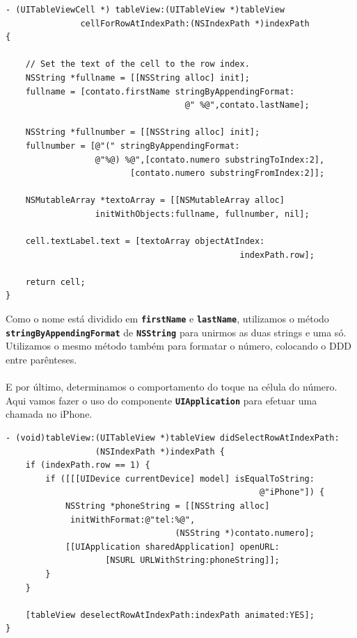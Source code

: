 \documentclass[a4paper,12pt,brazil,doubleside]{book}
\begin{document}
\begin{listing}
\begin{verbatim}
- (UITableViewCell *) tableView:(UITableView *)tableView
               cellForRowAtIndexPath:(NSIndexPath *)indexPath
{
    
    // Set the text of the cell to the row index.
    NSString *fullname = [[NSString alloc] init];
    fullname = [contato.firstName stringByAppendingFormat:
                                    @" %@",contato.lastName];
    
    NSString *fullnumber = [[NSString alloc] init];
    fullnumber = [@"(" stringByAppendingFormat:
                  @"%@) %@",[contato.numero substringToIndex:2],
                         [contato.numero substringFromIndex:2]];
    
    NSMutableArray *textoArray = [[NSMutableArray alloc]
                  initWithObjects:fullname, fullnumber, nil];

    cell.textLabel.text = [textoArray objectAtIndex:
                                               indexPath.row];
    
    return cell;
}
\end{verbatim}
\end{listing}

\pagebreak

Como o nome está dividido em \texttt{\textbf{firstName}} e \texttt{\textbf{lastName}}, utilizamos o método\\
\texttt{\textbf{stringByAppendingFormat}} de \texttt{\textbf{NSString}} para unirmos as duas strings e uma só. Utilizamos o mesmo método também para formatar o número, colocando o DDD entre parênteses.
\paragraph{}E por último, determinamos o comportamento do toque na célula do número. Aqui vamos fazer o uso do componente \texttt{\textbf{UIApplication}} para efetuar uma chamada no iPhone.

\begin{listing}
\begin{verbatim}
- (void)tableView:(UITableView *)tableView didSelectRowAtIndexPath:
                  (NSIndexPath *)indexPath {
    if (indexPath.row == 1) {
        if ([[[UIDevice currentDevice] model] isEqualToString:
                                                   @"iPhone"]) {
            NSString *phoneString = [[NSString alloc] 
             initWithFormat:@"tel:%@",
                                  (NSString *)contato.numero];
            [[UIApplication sharedApplication] openURL:
                    [NSURL URLWithString:phoneString]];
        }
    }
    
    [tableView deselectRowAtIndexPath:indexPath animated:YES];
}
\end{verbatim}
\end{listing}
\end{document}
